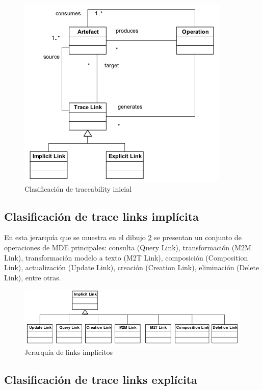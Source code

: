 \documentclass[a4paper,12pt,oneside]{book}
\begin{document}
\begin{figure}[hbtp]
\centering
\includegraphics[scale=0.75]{./img/ExplicitImplicitTraceLinkClassification}
\caption{Clasificación de traceability inicial}
\label{fig:ClasifInicial}
\end{figure}

\subsection{Clasificación de trace links implícita}

En esta jerarquía que se muestra en el dibujo \ref{fig:LinksImplicitos} se presentan un conjunto de operaciones de MDE principales: consulta (Query Link), transformación (M2M Link), transformación modelo a texto (M2T Link), composición (Composition Link), actualización (Update Link), creación (Creation Link), eliminación (Delete Link), entre otras.

\begin{figure}[hbtp]
\centering
\includegraphics[scale=0.55]{./img/ImplicitTraceLinks}
\caption{Jerarquía de links implícitos}
\label{fig:LinksImplicitos}
\end{figure}

\subsection{Clasificación de trace links explícita}
\end{document}

